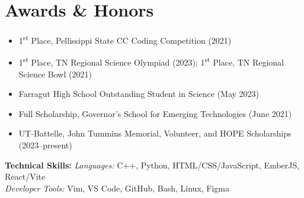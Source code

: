 \documentclass[11pt,a4paper]{article}
\begin{document}

\section*{Awards \& Honors}
\begin{itemize}[leftmargin=*, topsep=0pt, itemsep=2pt, parsep=0pt]
  \item 1\textsuperscript{st} Place, Pellissippi State CC Coding Competition (2021)
  \item 1\textsuperscript{st} Place, TN Regional Science Olympiad (2023); 1\textsuperscript{st} Place, TN Regional Science Bowl (2021)
  \item Farragut High School Outstanding Student in Science (May 2023)
  \item Full Scholarship, Governor’s School for Emerging Technologies (June 2021) 
  \item UT-Battelle, John Tummins Memorial, Volunteer, and HOPE Scholarships (2023–present)
\end{itemize}

\textbf{Technical Skills: }
\textit{Languages:} C++, Python, HTML/CSS/JavaScript, EmberJS, React/Vite \\ 
\textit{Developer Tools:} Vim, VS Code, GitHub, Bash, Linux, Figma

\end{document}
